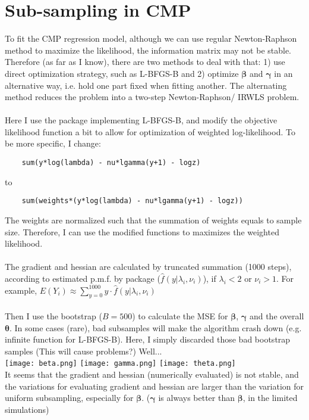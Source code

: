 \documentclass[]{article}
\begin{document}
\section{Sub-sampling in CMP}
To fit the CMP regression model, although we can use regular Newton-Raphson method to maximize the likelihood, the information matrix may not be stable. Therefore (as far as I know), there are two methods to deal with that: 1) use direct optimization strategy, such as L-BFGS-B and 2) optimize $\boldsymbol{\beta}$ and $\boldsymbol{\gamma}$ in an alternative way, i.e. hold one part fixed when fitting another. The alternating method reduces the problem into a two-step Newton-Raphson/ IRWLS problem.\\
\\
Here I use the package implementing L-BFGS-B, and modify the objective likelihood function a bit to allow for optimization of weighted log-likelihood. To be more specific, I change:
\begin{lstlisting}
	sum(y*log(lambda) - nu*lgamma(y+1) - logz)
\end{lstlisting} 
to
\begin{lstlisting}
	sum(weights*(y*log(lambda) - nu*lgamma(y+1) - logz))
\end{lstlisting} 
The weights are normalized such that the summation of weights equals to sample size. Therefore, I can use the modified functions to maximizes the weighted likelihood.\\
\\
The gradient and hessian are calculated by truncated summation (1000 steps), according to estimated p.m.f. by package ($\hat{f}(y|\lambda_i, \nu_i)$), if $\lambda_i < 2$ or $\nu_i >1$. For example, $E(Y_i) \approx \sum_{y=0}^{1000}y\cdot \hat{f}(y|\lambda_i, \nu_i)$\\
\\
Then I use the bootstrap ($B = 500$) to calculate the MSE for $\boldsymbol{\beta}$, $\boldsymbol{\gamma}$ and the overall $\boldsymbol{\theta}$. In some cases (rare), bad subsamples will make the algorithm crash down (e.g. infinite function for L-BFGS-B). Here, I simply discarded those bad bootstrap samples (This will cause problems?) Well...\\
\texttt{[image: beta.png]}
\texttt{[image: gamma.png]}
\texttt{[image: theta.png]}
\\
It seems that the gradient and hessian (numerically evaluated) is not stable, and the variations for evaluating gradient and hessian are larger than the variation for uniform subsampling, especially for $\boldsymbol{\beta}$. ($\boldsymbol{\gamma}$ is always better than $\boldsymbol{\beta}$, in the limited simulations) 
















 












	
	
	
	
	
	
\end{document}
